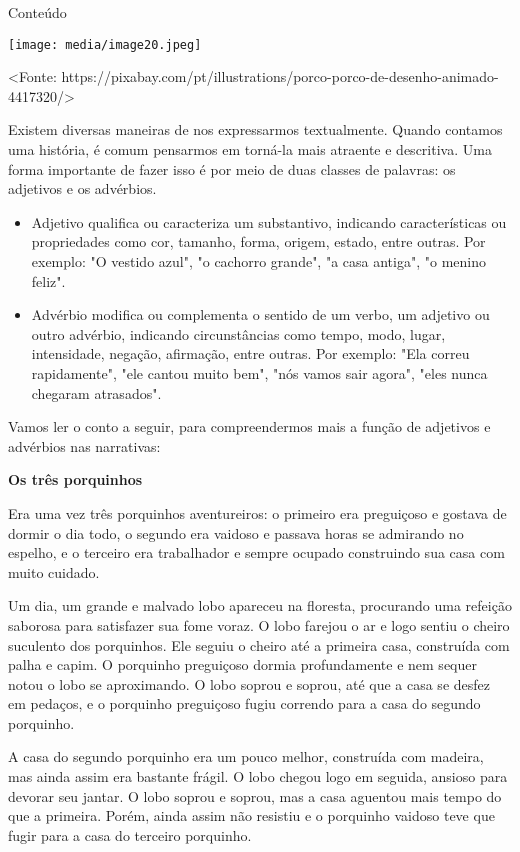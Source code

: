 Conteúdo

\texttt{[image: media/image20.jpeg]}

\textless{}Fonte:
https://pixabay.com/pt/illustrations/porco-porco-de-desenho-animado-4417320/\textgreater{}

Existem diversas maneiras de nos expressarmos textualmente. Quando
contamos uma história, é comum pensarmos em torná-la mais atraente e
descritiva. Uma forma importante de fazer isso é por meio de duas
classes de palavras: os adjetivos e os advérbios.

\begin{itemize}
\item
  Adjetivo qualifica ou caracteriza um substantivo, indicando
  características ou propriedades como cor, tamanho, forma, origem,
  estado, entre outras. Por exemplo: "O vestido azul", "o cachorro
  grande", "a casa antiga", "o menino feliz".
\item
  Advérbio modifica ou complementa o sentido de um verbo, um adjetivo ou
  outro advérbio, indicando circunstâncias como tempo, modo, lugar,
  intensidade, negação, afirmação, entre outras. Por exemplo: "Ela
  correu rapidamente", "ele cantou muito bem", "nós vamos sair agora",
  "eles nunca chegaram atrasados".
\end{itemize}

Vamos ler o conto a seguir, para compreendermos mais a função de
adjetivos e advérbios nas narrativas:

\textbf{Os três porquinhos}

Era uma vez três porquinhos aventureiros: o primeiro era preguiçoso e
gostava de dormir o dia todo, o segundo era vaidoso e passava horas se
admirando no espelho, e o terceiro era trabalhador e sempre ocupado
construindo sua casa com muito cuidado.

Um dia, um grande e malvado lobo apareceu na floresta, procurando uma
refeição saborosa para satisfazer sua fome voraz. O lobo farejou o ar e
logo sentiu o cheiro suculento dos porquinhos. Ele seguiu o cheiro até a
primeira casa, construída com palha e capim. O porquinho preguiçoso
dormia profundamente e nem sequer notou o lobo se aproximando. O lobo
soprou e soprou, até que a casa se desfez em pedaços, e o porquinho
preguiçoso fugiu correndo para a casa do segundo porquinho.

A casa do segundo porquinho era um pouco melhor, construída com madeira,
mas ainda assim era bastante frágil. O lobo chegou logo em seguida,
ansioso para devorar seu jantar. O lobo soprou e soprou, mas a casa
aguentou mais tempo do que a primeira. Porém, ainda assim não resistiu e
o porquinho vaidoso teve que fugir para a casa do terceiro porquinho.

